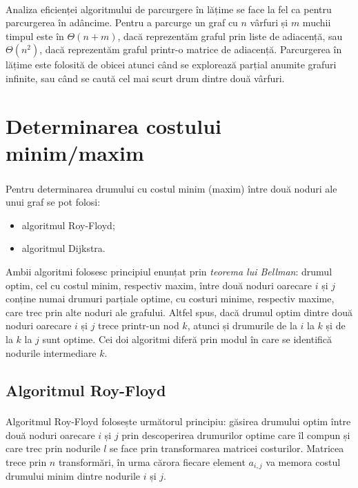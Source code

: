 \documentclass[9pt,a4paper]{report}
\begin{document}
Analiza eficienței\textsuperscript{\cite{andonie}} algoritmului de parcurgere în lățime se face la fel ca pentru parcurgerea în adâncime. Pentru a parcurge un graf cu $n$ vârfuri și $m$ muchii timpul este în $\Theta(n+m)$, dacă reprezentăm graful prin liste de adiacență, sau $\Theta(n^2)$, dacă reprezentăm graful printr-o matrice de adiacență. Parcurgerea în lățime este folosită de obicei atunci când se explorează parțial anumite grafuri infinite, sau când se caută cel mai scurt drum dintre două vârfuri.

\section{Determinarea costului minim/maxim}

Pentru determinarea drumului cu costul minim (maxim)\textsuperscript{\cite{milosescu}} între două noduri ale unui graf se pot folosi:

\begin{itemize}
    \item algoritmul Roy-Floyd;
    \item algoritmul Dijkstra.
\end{itemize}

Ambii algoritmi folosesc principiul enunțat prin \textit{teorema lui Bellman}: drumul optim, cel cu costul minim, respectiv maxim, între două noduri oarecare $i$ și $j$ conține numai drumuri parțiale optime, cu costuri minime, respectiv maxime, care trec prin alte noduri ale grafului. Altfel spus, dacă drumul optim dintre două noduri oarecare $i$ și $j$ trece printr-un nod $k$, atunci și drumurile de la $i$ la $k$ și de la $k$ la $j$ sunt optime. Cei doi algoritmi diferă prin modul în care se identifică nodurile intermediare $k$.

\subsection{Algoritmul Roy-Floyd}

Algoritmul Roy-Floyd\textsuperscript{\cite{milosescu}} folosește următorul principiu: găsirea drumului optim între două noduri oarecare $i$ și $j$ prin descoperirea drumurilor optime care îl compun și care trec prin nodurile $l$ se face prin transformarea matricei costurilor. Matricea trece prin $n$ transformări, în urma cărora fiecare element $a_{i,j}$ va memora costul drumului minim dintre nodurile $i$ și $j$.

\begin{algorithm}
    \begin{algorithmic}
                    \EndIf
                \EndFor
            \EndFor
        \EndProcedure
    \end{algorithmic}
\end{algorithm}
\end{document}
